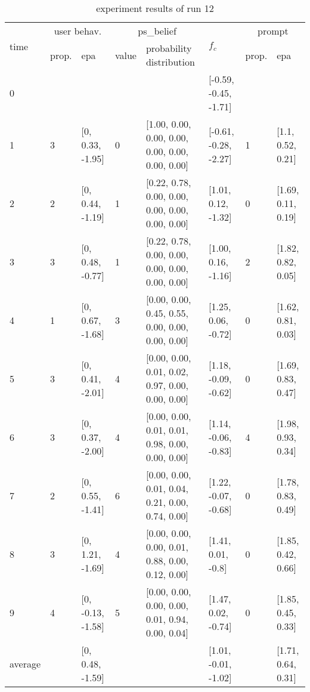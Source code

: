 

\begin{table}[htbp]\footnotesize
\caption{experiment results of run 12}
\begin{tabular}{|p{0.4cm}|p{0.6cm}|l|p{0.6cm}|p{3.3cm}|l|p{0.6cm}|l|}
\hline

\multirow{2}{*}{time} & \multicolumn{2}{c|}{user behav.} & \multicolumn{2}{c|}{ps\_belief} &
\multirow{2}{*}{$f_c$} & \multicolumn{2}{c|}{prompt} \\ \cline{2-5}\cline{ 7- 8}
& prop. & epa & value & probability distribution &  & prop. & epa \\ \hline

0 & \multicolumn{1}{l|}{} &  & \multicolumn{1}{l|}{} &  & [-0.59, -0.45, -1.71] & \multicolumn{1}{l|}{} &  \\ \hline
1 & 3 & [0, 0.33, -1.95] & 0 & [1.00, 0.00, 0.00, 0.00, 0.00, 0.00, 0.00, 0.00] & [-0.61, -0.28, -2.27] & 1 & [1.1, 0.52, 0.21] \\ \hline
2 & 2 & [0, 0.44, -1.19] & 1 & [0.22, 0.78, 0.00, 0.00, 0.00, 0.00, 0.00, 0.00] & [1.01, 0.12, -1.32] & 0 & [1.69, 0.11, 0.19] \\ \hline
3 & 3 & [0, 0.48, -0.77] & 1 & [0.22, 0.78, 0.00, 0.00, 0.00, 0.00, 0.00, 0.00] & [1.00, 0.16, -1.16] & 2 & [1.82, 0.82, 0.05] \\ \hline
4 & 1 & [0, 0.67, -1.68] & 3 & [0.00, 0.00, 0.45, 0.55, 0.00, 0.00, 0.00, 0.00] & [1.25, 0.06, -0.72] & 0 & [1.62, 0.81, 0.03] \\ \hline
5 & 3 & [0, 0.41, -2.01] & 4 & [0.00, 0.00, 0.01, 0.02, 0.97, 0.00, 0.00, 0.00] & [1.18, -0.09, -0.62] & 0 & [1.69, 0.83, 0.47] \\ \hline
6 & 3 & [0, 0.37, -2.00] & 4 & [0.00, 0.00, 0.01, 0.01, 0.98, 0.00, 0.00, 0.00] & [1.14, -0.06, -0.83] & 4 & [1.98, 0.93, 0.34] \\ \hline
7 & 2 & [0, 0.55, -1.41] & 6 & [0.00, 0.00, 0.01, 0.04, 0.21, 0.00, 0.74, 0.00] & [1.22, -0.07, -0.68] & 0 & [1.78, 0.83, 0.49] \\ \hline
8 & 3 & [0, 1.21, -1.69] & 4 & [0.00, 0.00, 0.00, 0.01, 0.88, 0.00, 0.12, 0.00] & [1.41, 0.01, -0.8] & 0 & [1.85, 0.42, 0.66] \\ \hline
9 & 4 & [0, -0.13, -1.58] & 5 & [0.00, 0.00, 0.00, 0.00, 0.01, 0.94, 0.00, 0.04] & [1.47, 0.02, -0.74] & 0 & [1.85, 0.45, 0.33] \\ \hline
\multicolumn{1}{|l|}{average} & \multicolumn{1}{l|}{} & [0, 0.48, -1.59] & \multicolumn{1}{l|}{} &  & [1.01, -0.01, -1.02] & \multicolumn{1}{l|}{} & [1.71, 0.64, 0.31] \\ \hline
\end{tabular}
\label{}
\end{table}


